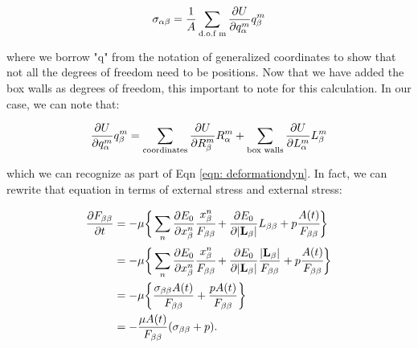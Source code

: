 \documentclass[12pt]{article}
\begin{document}
\begin{center}
\begin{equation}
\label{eqn: dof}
\sigma_{\alpha \beta} = \frac{1}{A} \sum\limits_{\text{d.o.f m}} \pdv{U}{q_\alpha^m} q_\beta^m
\end{equation}
\end{center}
where we borrow "q" from the notation of generalized coordinates to show that not all the degrees of freedom need to be positions. Now that we have added the box walls as degrees of freedom, this important to note for this calculation. In our case, we can note that:
\begin{center}
\begin{equation}
\label{eqn: absc}
\pdv{U}{q_\alpha^m} q_\beta^m = \sum\limits_{\text{coordinates}}\pdv{U}{R_\beta^m} R_\alpha^m + \sum\limits_{\text{box walls}}\pdv{U}{L_\alpha^m} L_\beta^m
\end{equation}
\end{center}
which we can recognize as part of Eqn \ref{eqn: deformationdyn}. In fact, we can rewrite that equation in terms of external stress and external stress:
\begin{center}
\begin{equation}
\label{eqn: deformationdyn2}
\begin{split}
\pdv{F_{\beta \beta}}{t} & = -\mu\bigg\{\sum\limits_{n} \pdv{E_0}{x_\beta^n}  \cfrac{x_\beta^n}{F_{\beta \beta}} + \pdv{E_0}{|\vb{L}_\beta|} L_{\beta \beta} + p \cfrac{A(t)}{F_{\beta\beta}}\bigg\}\\
&= -\mu\bigg\{\sum\limits_{n} \pdv{E_0}{x_\beta^n}  \cfrac{x_\beta^n}{F_{\beta \beta}} +  \pdv{E_0}{|\vb{L}_\beta|} \frac{|\vb{L}_{\beta}|}{F_{\beta\beta}} + p \cfrac{A(t)}{F_{\beta\beta}}\bigg\}\\
&= -\mu\bigg\{\frac{\sigma_{\beta \beta} A(t)}{F_{\beta \beta}} + \frac{p A(t)}{F_{\beta \beta}}  \bigg\}\\
&= -\frac{\mu A(t)}{F_{\beta \beta}} (\sigma_{\beta\beta} + p).
\end{split}
\end{equation}
\end{center}
\end{document}
